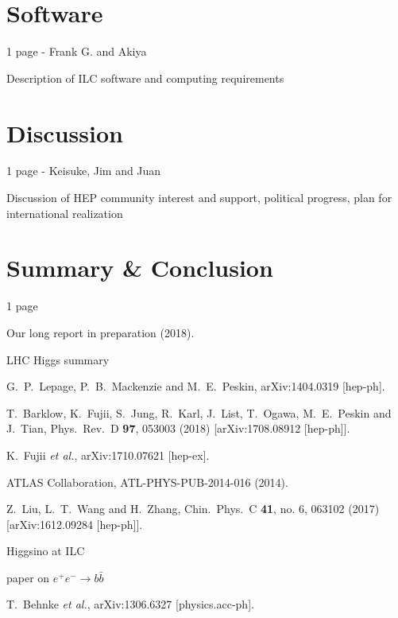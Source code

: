 \documentclass[%
 reprint,
 amsmath,amssymb,
 aps,
]{revtex4-1}
\def\ee{e^+e^-}
\begin{document}
\section{\label{sec:soft}Software}

1 page - Frank G. and Akiya

  Description of ILC software and computing requirements

\section{\label{sec:discuss}Discussion}

1 page - Keisuke, Jim and Juan

    Discussion of HEP community interest and support, political progress, plan for international realization

\section{\label{sec:sum}Summary \& Conclusion} 

1 page


\begin{thebibliography}{99}


Our long report in preparation  (2018). 


LHC Higgs summary

  G.~P.~Lepage, P.~B.~Mackenzie and M.~E.~Peskin,
  arXiv:1404.0319 [hep-ph].

  T.~Barklow, K.~Fujii, S.~Jung, R.~Karl, J.~List, T.~Ogawa, M.~E.~Peskin and J.~Tian,
  Phys.\ Rev.\ D {\bf 97},  053003 (2018)
  [arXiv:1708.08912 [hep-ph]].
 
  K.~Fujii {\it et al.},
  arXiv:1710.07621 [hep-ex].


ATLAS Collaboration, ATL-PHYS-PUB-2014-016 (2014).

 Z.~Liu, L.~T.~Wang and H.~Zhang,
  Chin.\ Phys.\ C {\bf 41}, no. 6, 063102 (2017)
  [arXiv:1612.09284 [hep-ph]].



Higgsino at ILC


paper on $\ee\to b\bar b$


  T.~Behnke {\it et al.},
  arXiv:1306.6327 [physics.acc-ph].


\end{thebibliography}
\end{document}
